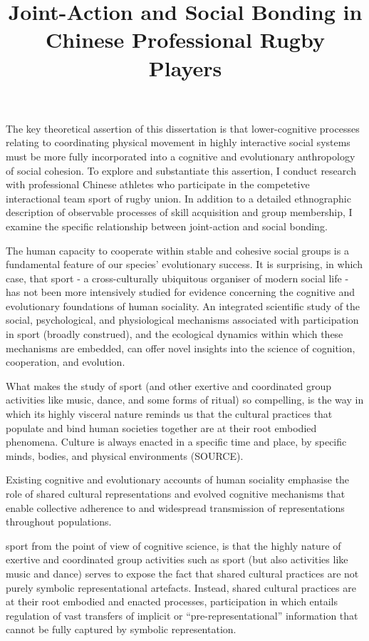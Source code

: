 \documentclass[12pt]{report}
\title{
{Joint-Action and Social Bonding in Chinese Professional Rugby Players}\\
}
\begin{document}
\maketitle{}

The key theoretical assertion of this dissertation is that lower-cognitive processes relating to coordinating physical movement in highly interactive social systems must be more fully incorporated into a cognitive and evolutionary anthropology of social cohesion. To explore and substantiate this assertion, I conduct research with professional Chinese athletes who participate in the competetive interactional team sport of rugby union.  In addition to a detailed ethnographic description of observable processes of skill acquisition and group membership, I examine the specific relationship between joint-action and social bonding.

The human capacity to cooperate within stable and cohesive social groups is a fundamental feature of our species' evolutionary success. It is surprising, in which case, that sport - a cross-culturally ubiquitous organiser of modern social life - has not been more intensively studied for evidence concerning the cognitive and evolutionary foundations of human sociality.  An integrated scientific study of the social, psychological, and physiological mechanisms associated with participation in sport (broadly construed), and the ecological dynamics within which these mechanisms are embedded, can offer novel insights into the science of cognition, cooperation, and evolution.

What makes the study of sport (and other exertive and coordinated group activities like music, dance, and some forms of ritual) so compelling, is the way in which its highly visceral nature reminds us that the cultural practices that populate and bind human societies together are at their root embodied phenomena.  Culture is always enacted in a specific time and place, by specific minds, bodies, and physical environments (SOURCE).


Existing cognitive and evolutionary accounts of human sociality emphasise the role of shared cultural representations and evolved cognitive mechanisms that enable collective adherence to and widespread transmission of representations throughout populations.

sport from the point of view of cognitive science, is that
the highly  nature of exertive and coordinated group activities such as sport (but also activities like music and dance) serves to expose the fact that shared cultural practices are not purely symbolic representational artefacts. Instead, shared cultural practices are at their root embodied and enacted processes, participation in which entails regulation of vast transfers of implicit or ``pre-representational'' information that cannot be fully captured by symbolic representation.
\end{document}
